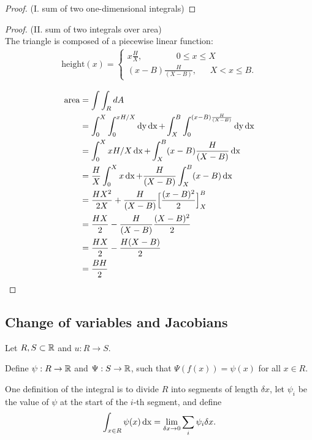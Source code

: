 \begin{proof}(I. sum of two one-dimensional integrals)
\end{proof}

\begin{proof}(II. sum of two integrals over area)\\
  The triangle is composed of a piecewise linear function:
  \begin{align*}
    \text{height}(x) =
    \begin{cases}
      x\frac{H}{X}, ~~~~~~~~~~~~~~~~~~     0 \leq x \leq X\\
      (x - B)\frac{H}{(X - B)}, ~~~~~~~ X < x \leq B.
    \end{cases}
  \end{align*}

  \begin{align*}
    \text{area} &= \int\int_R dA\\
                &= \int_0^X \int_0^{xH/X} \operatorname{\text{dy}} \operatorname{\text{dx}} + \int_X^B\int_0^{(x - B)\frac{H}{(X - B)}}\operatorname{\text{dy}}\operatorname{\text{dx}}\\
                &= \int_0^X xH/X \operatorname{\text{dx}} + \int_X^B (x - B)\frac{H}{(X - B)} \operatorname{\text{dx}}\\
                &= \frac{H}{X}\int_0^X x \operatorname{\text{dx}} + \frac{H}{(X - B)}\int_X^B (x - B) \operatorname{\text{dx}}\\
                &= \frac{HX^2}{2X} + \frac{H}{(X - B)}\Big[\frac{(x - B)^2}{2}\Big]_X^B\\
                &= \frac{HX}{2} - \frac{H}{(X - B)}\frac{(X - B)^2}{2}\\
                &= \frac{HX}{2} - \frac{H(X - B)}{2}\\
                &= \frac{BH}{2}
  \end{align*}
\end{proof}


\newpage
\subsection{Change of variables and Jacobians}
Let $R, S \subset \mathbb{R}$ and $u:R \to S$.

Define $\psi: R \to \mathbb{R}$ and $\Psi: S \to \mathbb{R}$, such that $\Psi(f(x)) = \psi(x)$ for all $x \in R$.

One definition of the integral is to divide $R$ into segments of length $\delta x$, let $\psi_i$ be
the value of $\psi$ at the start of the $i$-th segment, and define
\begin{align*}
  \int_{x \in R} \psi(x) \operatorname{\text{dx}} = \lim_{\delta x \to 0} \sum_i \psi_i\delta x.
\end{align*}

